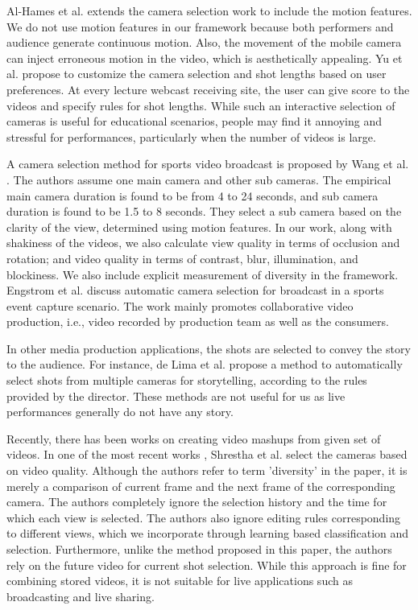 \documentclass{sig-alternate}
\begin{document}
Al-Hames et al. \cite{3} extends the camera selection work to include the motion features. We do not use motion features in our framework because both performers and audience generate continuous motion. Also, the movement of the mobile camera can inject erroneous motion in the video, which is aesthetically appealing. Yu et al. \cite{20} propose to customize the camera selection and shot lengths based on user preferences. At every lecture webcast receiving site, the user can give score to the videos and specify rules for shot lengths. While such an interactive selection of cameras is useful for educational scenarios, people may find it annoying and stressful for performances, particularly when the number of videos is large.

A camera selection method for sports video broadcast is proposed by Wang et al. \cite{16}. The authors assume one main camera and other sub cameras. The empirical main camera duration is found to be from 4 to 24 seconds, and sub camera duration is found to be 1.5 to 8 seconds. They select a sub camera based on the clarity of the view, determined using motion features. In our work, along with shakiness of the videos, we also calculate view quality in terms of occlusion and rotation; and video quality in terms of contrast, blur, illumination, and blockiness. We also include explicit measurement of diversity in the framework. Engstrom et al. \cite{8} discuss automatic camera selection for broadcast in a sports event capture scenario. The work mainly promotes collaborative
video production, i.e., video recorded by production team as well
as the consumers.

In other media production applications, the shots are selected to
convey the story to the audience. For instance, de Lima et al. \cite{7} propose a method to automatically select shots from multiple cameras for storytelling, according to the rules provided by the director.
These methods are not useful for us as live performances generally
do not have any story.

Recently, there has been works on creating video mashups from
given set of videos. In one of the most recent works \cite{15}, Shrestha et al. select the cameras based on video quality. Although the authors refer to term 'diversity' in the paper, it is merely a comparison of current frame and the next frame of the corresponding camera. The authors completely ignore the selection history and the time for which each view is selected. The authors also ignore editing rules corresponding to different views, which we incorporate through learning based classification and selection. Furthermore, unlike the method proposed in this paper, the authors rely on the future video for current shot selection. While this approach is fine for combining stored videos, it is not suitable for live applications
such as broadcasting and live sharing.
\end{document}
